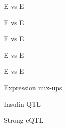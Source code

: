 \documentclass[12pt,t]{beamer}
\begin{document}
\begin{frame}[c]{E vs E}
\note{}
\end{frame}


\begin{frame}[c]{E vs E}
\note{}
\end{frame}


\begin{frame}[c]{E vs E}
\note{}
\end{frame}


\begin{frame}[c]{E vs E}
\note{}
\end{frame}


\begin{frame}[c]{E vs E}
\note{}
\end{frame}

\begin{frame}[c]{Expression mix-ups}
\note{}
\end{frame}

\begin{frame}[c]{Insulin QTL}
\note{}
\end{frame}


\begin{frame}[c]{Strong eQTL}
\note{}
\end{frame}
\end{document}
